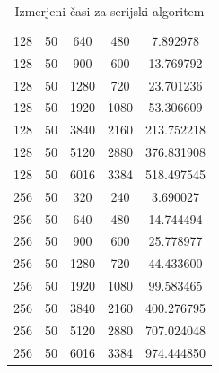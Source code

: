 \documentclass[11pt]{article}
\begin{document}
\begin{table}[H]
\begin{tabular}{c|c|c|c|c}
        128 & 50  & 640     & 480      & 7.892978   \\
        128 & 50  & 900     & 600      & 13.769792  \\
        128 & 50  & 1280    & 720      & 23.701236  \\
        128 & 50  & 1920    & 1080     & 53.306609  \\
        128 & 50  & 3840    & 2160     & 213.752218 \\
        128 & 50  & 5120    & 2880     & 376.831908 \\
        128 & 50  & 6016    & 3384     & 518.497545 \\
        256 & 50  & 320     & 240      & 3.690027   \\
        256 & 50  & 640     & 480      & 14.744494  \\
        256 & 50  & 900     & 600      & 25.778977  \\
        256 & 50  & 1280    & 720      & 44.433600  \\
        256 & 50  & 1920    & 1080     & 99.583465  \\
        256 & 50  & 3840    & 2160     & 400.276795 \\
        256 & 50  & 5120    & 2880     & 707.024048 \\
        256 & 50  & 6016    & 3384     & 974.444850 \\
    \end{tabular}
    \caption{Izmerjeni časi za serijski algoritem}
\end{table}
\end{document}
